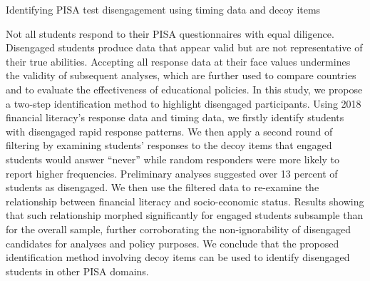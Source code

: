 Identifying PISA test disengagement using timing data and decoy items

Not all students respond to their PISA questionnaires with equal diligence. Disengaged students produce data that appear valid but are not representative of their true abilities. Accepting all response data at their face values undermines the validity of subsequent analyses, which are further used to compare countries and to evaluate the effectiveness of educational policies. In this study, we propose a two-step identification method to highlight disengaged participants. Using 2018 financial literacy's response data and timing data, we firstly identify students with disengaged rapid response patterns. We then apply a second round of filtering by examining students' responses to the decoy items that engaged students would answer ``never'' while random responders were more likely to report higher frequencies. Preliminary analyses suggested over 13 percent of students as disengaged. We then use the filtered data to re-examine the relationship between financial literacy and socio-economic status. Results showing that such relationship morphed significantly for engaged students subsample than for the overall sample, further corroborating the non-ignorability of disengaged candidates for analyses and policy purposes. We conclude that the proposed identification method involving decoy items can be used to identify disengaged students in other PISA domains.
